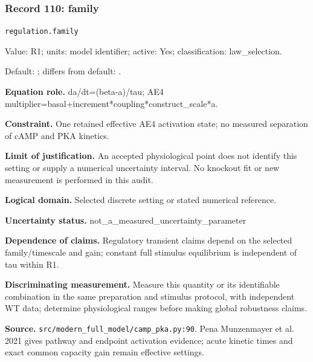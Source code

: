 \subsubsection*{Record 110: family}
{\small \nolinkurl{regulation.family}\par

Value: R1; units: model identifier; active: Yes; classification: law\_selection.\par

Default: ; differs from default: .\par

\textbf{Equation role.} da/dt=(beta-a)/tau; AE4 multiplier=basal+increment*coupling*construct\_scale*a.\par

\textbf{Constraint.} One retained effective AE4 activation state; no measured separation of cAMP and PKA kinetics.\par

\textbf{Limit of justification.} An accepted physiological point does not identify this setting or supply a numerical uncertainty interval. No knockout fit or new measurement is performed in this audit.\par

\textbf{Logical domain.} Selected discrete setting or stated numerical reference.\par

\textbf{Uncertainty status.} not\_a\_measured\_uncertainty\_parameter\par

\textbf{Dependence of claims.} Regulatory transient claims depend on the selected family/timescale and gain; constant full stimulus equilibrium is independent of tau within R1.\par

\textbf{Discriminating measurement.} Measure this quantity or its identifiable combination in the same preparation and stimulus protocol, with independent WT data; determine physiological ranges before making global robustness claims.\par

\textbf{Source.} \nolinkurl{src/modern_full_model/camp_pka.py:90}. Pena Munzenmayer et al. 2021 gives pathway and endpoint activation evidence; acute kinetic times and exact common capacity gain remain effective settings.\par}

